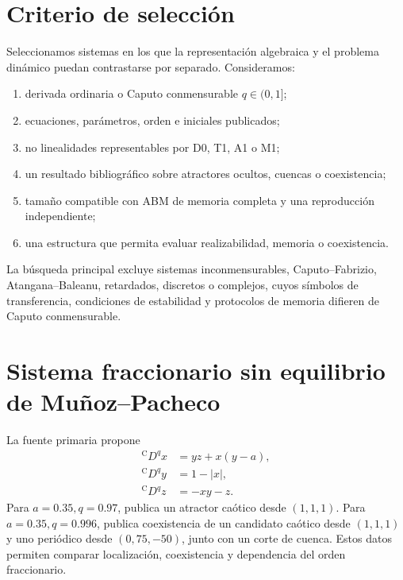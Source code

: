\section{Criterio de selección}
\label{sec:candidate-selection}

\HAFOCardCandidates

Seleccionamos sistemas en los que la representación algebraica y el
problema dinámico puedan contrastarse por separado. Consideramos:

\begin{enumerate}
 \item derivada ordinaria o Caputo conmensurable \(q\in(0,1]\);
 \item ecuaciones, parámetros, orden e iniciales publicados;
 \item no linealidades representables por D0, T1, A1 o M1;
 \item un resultado bibliográfico sobre atractores ocultos, cuencas o coexistencia;
 \item tamaño compatible con ABM de memoria completa y una reproducción
 independiente;
 \item una estructura que permita evaluar realizabilidad, memoria o coexistencia.
\end{enumerate}

La búsqueda principal excluye sistemas inconmensurables, Caputo--Fabrizio,
Atangana--Baleanu, retardados, discretos o complejos, cuyos símbolos de
transferencia, condiciones de estabilidad y protocolos de memoria difieren de
Caputo conmensurable.

\section[Sistema Muñoz--Pacheco sin equilibrio]
{Sistema fraccionario sin equilibrio de Muñoz--Pacheco}
\label{sec:cand-munoz}

La fuente primaria \cite{munoz2018} propone
\begin{equation}
\begin{aligned}
 {}^{\mathrm C}D^q x&=yz+x(y-a),\\
 {}^{\mathrm C}D^q y&=1-|x|,\\
 {}^{\mathrm C}D^q z&=-xy-z.
\end{aligned}
\label{eq:cand-munoz}
\end{equation}
Para \(a=0.35,q=0.97\), publica un atractor caótico desde
\((1,1,1)\). Para \(a=0.35,q=0.996\), publica coexistencia de un candidato
caótico desde \((1,1,1)\) y uno periódico desde \((0,75,-50)\), junto con un
corte de cuenca. Estos datos permiten comparar localización, coexistencia y
dependencia del orden fraccionario.

